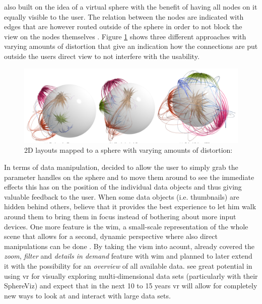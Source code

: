 \cite{Kwon2015} also built on the idea of a virtual sphere with the benefit of having all nodes on it equally visible to the user. The relation between the nodes are indicated with edges that are however routed outside of the sphere in order to not block the view on the nodes themselves \citep{Kwon2015}. Figure \ref{fig:sphericalgraph} shows three different approaches with varying amounts of distortion that give an indication how the connections are put outside the users direct view to not interfere with the usability.
\begin{figure}[h]
	\begin{center}
		\includegraphics[width=14cm]{03_Figures/05_LitReview/Kwon2015_SphericalGraphLayout.png}
		\caption[2D layouts mapped to a sphere with varying amounts of distortion]{2D layouts mapped to a sphere with varying amounts of distortion:  \citep{Kwon2015}}
		\label{fig:sphericalgraph}
	\end{center}
\end{figure} \newline
In terms of data manipulation, \cite{Soldati2007} decided to allow the user to simply grab the parameter handles on the sphere and to move them around to see the immediate effects this has on the position of the individual data objects and thus giving valuable feedback to the user. When some data objects (i.e. thumbnails) are hidden behind others, \cite{Soldati2007} believe that it provides the best experience to let him walk around them to bring them in focus instead of bothering about more input devices. One more feature is the \gls{wim}, a small-scale representation of the whole scene that allows for a second, dynamic perspective where also direct manipulations can be done \citep{Soldati2007}. By taking the \gls{vism} into acount, \cite{Soldati2007} already covered the \textit{zoom}, \textit{filter} and \textit{details in demand} feature with \gls{wim} and planned to later extend it with the possibility for an \textit{overview} of all available data. \cite{Soldati2007} see great potential in using \gls{vr} for visually exploring multi-dimensional data sets (particularly with their SphereViz) and expect that in the next 10 to 15 years \gls{vr} will allow for completely new ways to look at and interact with large data sets.


